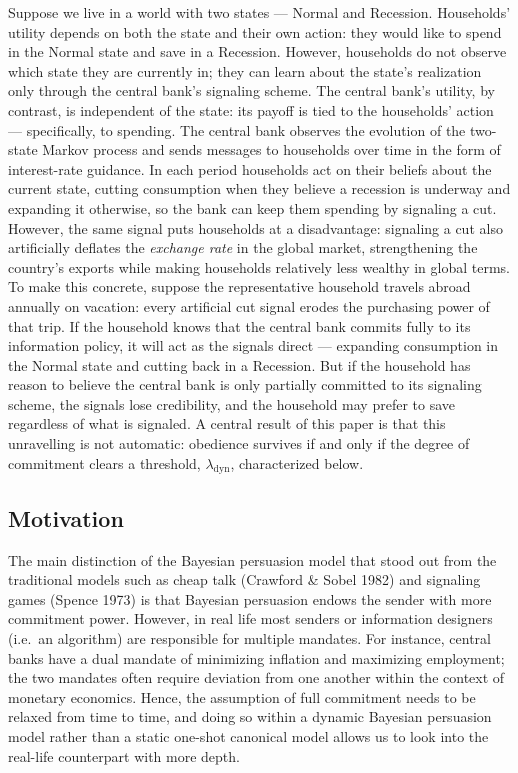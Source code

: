 \documentclass[12pt]{article}
\begin{document}
Suppose we live in a world with two states --- Normal and Recession. Households' utility depends on both the state and their own action: they would like to spend in the Normal state and save in a Recession. However, households do not observe which state they are currently in; they can learn about the state's realization only through the central bank's signaling scheme. The central bank's utility, by contrast, is independent of the state: its payoff is tied to the households' action --- specifically, to spending. The central bank observes the evolution of the two-state Markov process and sends messages to households over time in the form of interest-rate guidance. In each period households act on their beliefs about the current state, cutting consumption when they believe a recession is underway and expanding it otherwise, so the bank can keep them spending by signaling a cut. However, the same signal puts households at a disadvantage: signaling a cut also artificially deflates the \textit{exchange rate} in the global market, strengthening the country's exports while making households relatively less wealthy in global terms. To make this concrete, suppose the representative household travels abroad annually on vacation: every artificial cut signal erodes the purchasing power of that trip. If the household knows that the central bank commits fully to its information policy, it will act as the signals direct --- expanding consumption in the Normal state and cutting back in a Recession. But if the household has reason to believe the central bank is only partially committed to its signaling scheme, the signals lose credibility, and the household may prefer to save regardless of what is signaled. A central result of this paper is that this unravelling is not automatic: obedience survives if and only if the degree of commitment clears a threshold, $\lambda_{\mathrm{dyn}}$, characterized below.

\subsection{Motivation}\label{Motivation}

The main distinction of the Bayesian persuasion model that stood out from the traditional models such as cheap talk (Crawford \& Sobel 1982) and signaling games (Spence 1973) is that Bayesian persuasion endows the sender with more commitment power. However, in real life most senders or information designers (i.e.\ an algorithm) are responsible for multiple mandates. For instance, central banks have a dual mandate of minimizing inflation and maximizing employment; the two mandates often require deviation from one another within the context of monetary economics. Hence, the assumption of full commitment needs to be relaxed from time to time, and doing so within a dynamic Bayesian persuasion model rather than a static one-shot canonical model allows us to look into the real-life counterpart with more depth.
\end{document}
